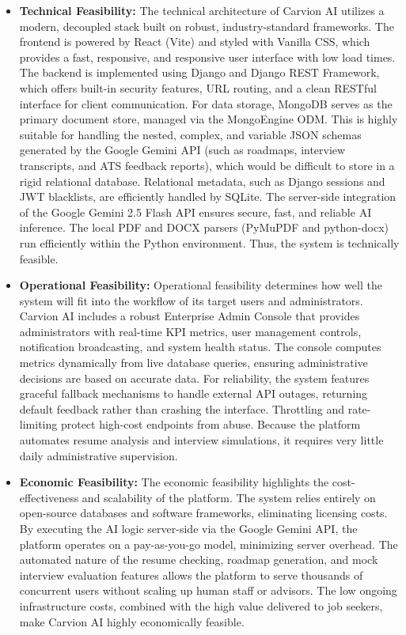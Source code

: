 \documentclass[12pt]{article}
\begin{document}
\begin{itemize}
  \item \textbf{Technical Feasibility:} The technical architecture of Carvion AI utilizes a modern, decoupled stack built on robust, industry-standard frameworks. The frontend is powered by React (Vite) and styled with Vanilla CSS, which provides a fast, responsive, and responsive user interface with low load times. The backend is implemented using Django and Django REST Framework, which offers built-in security features, URL routing, and a clean RESTful interface for client communication. For data storage, MongoDB serves as the primary document store, managed via the MongoEngine ODM. This is highly suitable for handling the nested, complex, and variable JSON schemas generated by the Google Gemini API (such as roadmaps, interview transcripts, and ATS feedback reports), which would be difficult to store in a rigid relational database. Relational metadata, such as Django sessions and JWT blacklists, are efficiently handled by SQLite. The server-side integration of the Google Gemini 2.5 Flash API ensures secure, fast, and reliable AI inference. The local PDF and DOCX parsers (PyMuPDF and python-docx) run efficiently within the Python environment. Thus, the system is technically feasible.
  \item \textbf{Operational Feasibility:} Operational feasibility determines how well the system will fit into the workflow of its target users and administrators. Carvion AI includes a robust Enterprise Admin Console that provides administrators with real-time KPI metrics, user management controls, notification broadcasting, and system health status. The console computes metrics dynamically from live database queries, ensuring administrative decisions are based on accurate data. For reliability, the system features graceful fallback mechanisms to handle external API outages, returning default feedback rather than crashing the interface. Throttling and rate-limiting protect high-cost endpoints from abuse. Because the platform automates resume analysis and interview simulations, it requires very little daily administrative supervision.
  \item \textbf{Economic Feasibility:} The economic feasibility highlights the cost-effectiveness and scalability of the platform. The system relies entirely on open-source databases and software frameworks, eliminating licensing costs. By executing the AI logic server-side via the Google Gemini API, the platform operates on a pay-as-you-go model, minimizing server overhead. The automated nature of the resume checking, roadmap generation, and mock interview evaluation features allows the platform to serve thousands of concurrent users without scaling up human staff or advisors. The low ongoing infrastructure costs, combined with the high value delivered to job seekers, make Carvion AI highly economically feasible.
\end{itemize}
\end{document}

